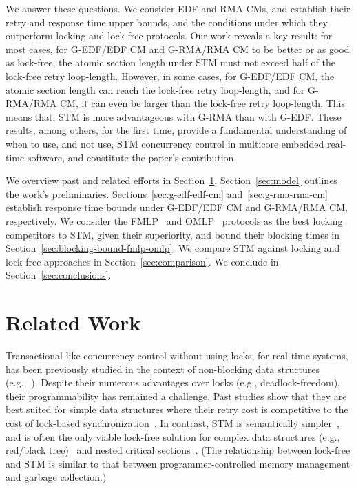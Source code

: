 \documentclass{sig-alternate}
\begin{document}
We answer these questions. We consider EDF and RMA CMs, and establish their retry and response time upper bounds, and the conditions under which they outperform locking and lock-free protocols. Our work reveals a key result: for most cases, for G-EDF/EDF CM and G-RMA/RMA CM to be better or as good as lock-free, the atomic section length under STM must not exceed half of the lock-free retry loop-length. However, in some cases, for G-EDF/EDF CM, the atomic section length can reach the lock-free retry loop-length, and for G-RMA/RMA CM, it can even be larger than the lock-free retry loop-length.  This means that, STM is more advantageous with G-RMA than with G-EDF.
These results, among others, for the first time, provide a
fundamental understanding of when to use, and not use, STM concurrency
control in multicore embedded real-time software, and constitute the
paper's contribution. 

We overview past and related efforts in Section~\ref{sec:past}. Section~\ref{sec:model} outlines the work's preliminaries. Sections~\ref{sec:g-edf-edf-cm} and~\ref{sec:g-rma-rma-cm}
establish response time bounds under G-EDF/EDF CM and G-RMA/RMA CM, 
respectively. We consider the FMLP~\cite{key-4} and OMLP~\cite{key-3} protocols as the best locking competitors to STM, given their superiority, and bound their blocking times in Section~\ref{sec:blocking-bound-fmlp-omlp}. We compare STM against locking and lock-free approaches in Section~\ref{sec:comparison}. We conclude in Section~\ref{sec:conclusions}.

\section{Related Work}
\label{sec:past}

Transactional-like concurrency control without using locks, for real-time systems, has been previously studied in the context of non-blocking data structures (e.g.,~\cite{anderson95realtime}). Despite their numerous advantages over locks 
(e.g., deadlock-freedom), 
their programmability has remained a challenge. 
Past studies show that they are best suited for simple data structures where their retry cost is competitive to the cost of lock-based synchronization~\cite{bc+08}.  In contrast, STM is semantically simpler~\cite{Herlihy:2006:AMP:1146381.1146382}, and is often the only viable lock-free solution for complex data structures (e.g., red/black tree)~\cite{key-1} and nested critical sections~\cite{Saha:2006:MHP:1122971.1123001}. (The relationship between lock-free and STM is similar to that between programmer-controlled memory management and garbage collection.)
\end{document}
